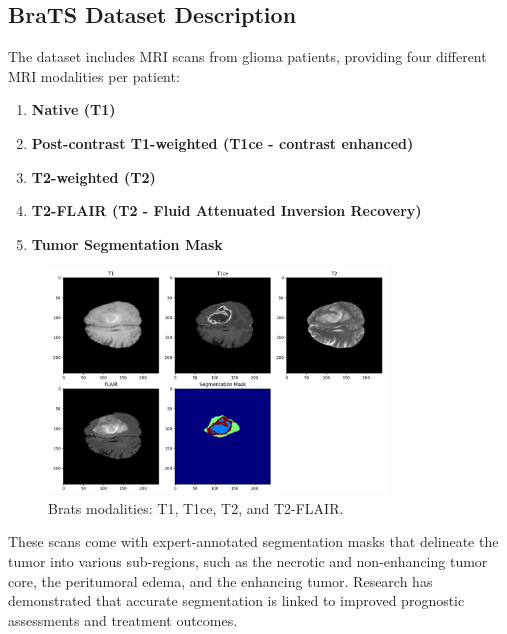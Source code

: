 \subsection{BraTS Dataset Description}
The dataset includes MRI scans from glioma patients, providing four different MRI modalities per patient:
\begin{enumerate}
  \item \textbf{Native (T1)}
  \item \textbf{Post-contrast T1-weighted (T1ce - contrast enhanced)}
  \item \textbf{T2-weighted (T2)}
  \item \textbf{T2-FLAIR (T2 - Fluid Attenuated Inversion Recovery)}
  \item \textbf{Tumor Segmentation Mask}
\end{enumerate}
\begin{figure}[H]
  \centering
  \includegraphics[width=0.8\textwidth]{Images/Chapter3/modalities.png}
  \caption{Brats modalities: T1, T1ce, T2, and T2-FLAIR.}
  \label{fig:modalities}
\end{figure}

These scans come with expert-annotated segmentation masks that delineate the tumor into various sub-regions, such as the necrotic and non-enhancing tumor core, the peritumoral edema, and the enhancing tumor. Research has demonstrated that accurate segmentation is linked to improved prognostic assessments and treatment outcomes.

